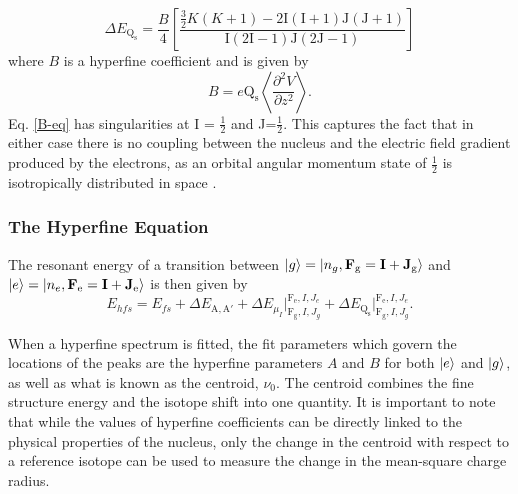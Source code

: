 \begin{equation}
\Delta E_{\mathrm{Q_s}} = \frac{B}{4}\left[\frac{\frac{3}{2}K(K+1)-2\mathrm{I}(\mathrm{I}+1)\mathrm{J}(\mathrm{J}+1)}{\mathrm{I}(2\mathrm{I}-1)\mathrm{J}(2\mathrm{J}-1)}\right]
\label{B-eq}
\end{equation}
where $B$ is a hyperfine coefficient and is given by \cite{TomT}
\begin{equation}
B = e\mathrm{Q_s}\left\langle\frac{\partial^2V}{\partial z^2} \right\rangle.
\end{equation}
Eq. \ref{B-eq} has singularities at I = $\frac{1}{2}$ and J=$\frac{1}{2}$. This captures the fact that in either case there is no coupling between the nucleus and the electric field gradient produced by the electrons, as an orbital angular momentum state of $\frac{1}{2}$ is isotropically distributed in space .

\subsubsection{The Hyperfine Equation}
The resonant energy of a transition between $\ket{g}=\ket{n_g,\mathrm{\textbf{F}_g=\textbf{I} + \textbf{J}_g}}$ and $\ket{e}=\ket{n_e,\mathrm{\textbf{F}_e=\textbf{I} + \textbf{J}_e}}$ is then given by
\begin{equation}
E_{hfs} = E_{fs} +  \Delta E_{\mathrm{A,A'}}+\Delta E_{\mu_I}\Bigr|_{\mathrm{F_g},I,J_g}^{\mathrm{F_e},I,J_e}+\Delta E_{\mathrm{Q_s}}\Bigr|_{\mathrm{F_g},I,J_g}^{\mathrm{F_e},I,J_e}.
\label{HFE}
\end{equation}

\noindent When a hyperfine spectrum is fitted, the fit parameters which govern the locations of the peaks are the hyperfine parameters $A$ and $B$ for both $\ket{e}$ and $\ket{g}$, as well as what is known as the centroid, $\nu_0$. The centroid combines the fine structure energy and the isotope shift into one quantity. It is important to note that while the values of hyperfine coefficients can be directly linked to the physical properties of the nucleus, only the change in the centroid with respect to a reference isotope can be used to measure the change in the mean-square charge radius.

